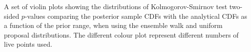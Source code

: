 \label{fig:walkunipropks}
A set of violin plots showing the distributions of Kolmogorov-Smirnov test
two-sided $p$-values comparing the posterior sample CDFs with the analytical
CDFs as a function of the prior range, when using the ensemble walk and uniform proposal distributions. The different colour plot represent different numbers of live points used.

